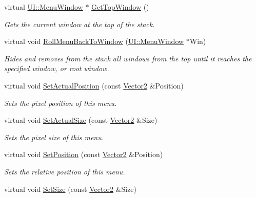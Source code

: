 \begin{DoxyCompactItemize}
virtual \hyperlink{classMezzanine_1_1UI_1_1MenuWindow}{UI::MenuWindow} $\ast$ \hyperlink{classMezzanine_1_1UI_1_1Menu_a370c1411203c58698104a92d2b508b99}{GetTopWindow} ()
\begin{DoxyCompactList}\small\item\em Gets the current window at the top of the stack. \item\end{DoxyCompactList}\item 
virtual void \hyperlink{classMezzanine_1_1UI_1_1Menu_a671031f5e8ae5890d952e5f6646cdb66}{RollMenuBackToWindow} (\hyperlink{classMezzanine_1_1UI_1_1MenuWindow}{UI::MenuWindow} $\ast$Win)
\begin{DoxyCompactList}\small\item\em Hides and removes from the stack all windows from the top until it reaches the specified window, or root window. \item\end{DoxyCompactList}\item 
virtual void \hyperlink{classMezzanine_1_1UI_1_1Menu_a0638a7f234bc62e4c7b7dc0253a5d68e}{SetActualPosition} (const \hyperlink{classMezzanine_1_1Vector2}{Vector2} \&Position)
\begin{DoxyCompactList}\small\item\em Sets the pixel position of this menu. \item\end{DoxyCompactList}\item 
virtual void \hyperlink{classMezzanine_1_1UI_1_1Menu_a639a1362c09b87855a8c574995c4af87}{SetActualSize} (const \hyperlink{classMezzanine_1_1Vector2}{Vector2} \&Size)
\begin{DoxyCompactList}\small\item\em Sets the pixel size of this menu. \item\end{DoxyCompactList}\item 
virtual void \hyperlink{classMezzanine_1_1UI_1_1Menu_ab15befd0341286dd2bcfc35e2046316a}{SetPosition} (const \hyperlink{classMezzanine_1_1Vector2}{Vector2} \&Position)
\begin{DoxyCompactList}\small\item\em Sets the relative position of this menu. \item\end{DoxyCompactList}\item 
virtual void \hyperlink{classMezzanine_1_1UI_1_1Menu_ab3e0d3ea65a0bb5e19639bdd283796d0}{SetSize} (const \hyperlink{classMezzanine_1_1Vector2}{Vector2} \&Size)

\end{DoxyCompactItemize}
